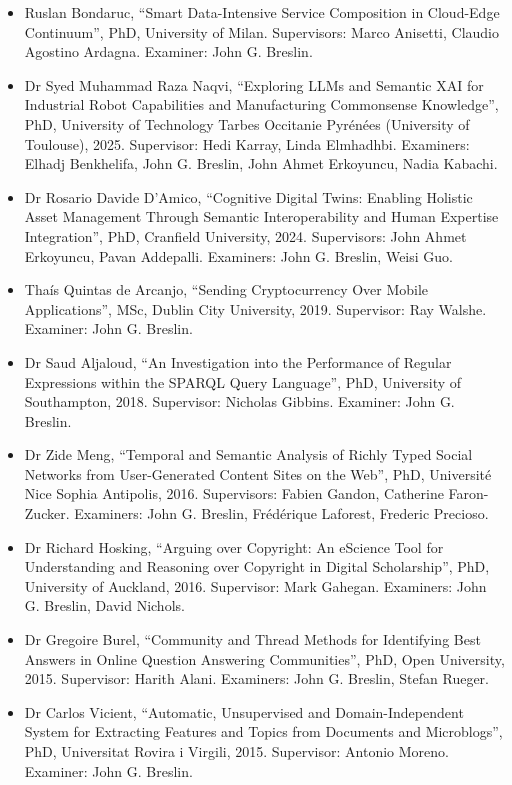\documentclass[10pt,a4paper]{res} %
\begin{document}
\begin{resume}
\begin{itemize} \itemsep -2pt
\item Ruslan Bondaruc, ``Smart Data-Intensive Service Composition in Cloud-Edge Continuum'', PhD, University of Milan. Supervisors: Marco Anisetti, Claudio Agostino Ardagna. Examiner: John G. Breslin.
\item Dr Syed Muhammad Raza Naqvi, ``Exploring LLMs and Semantic XAI for Industrial Robot Capabilities and Manufacturing Commonsense Knowledge'', PhD, University of Technology Tarbes Occitanie Pyr\'{e}n\'{e}es (University of Toulouse), 2025. Supervisor: Hedi Karray, Linda Elmhadhbi. Examiners: Elhadj Benkhelifa, John G. Breslin, John Ahmet Erkoyuncu, Nadia Kabachi. %
\item Dr Rosario Davide D'Amico, ``Cognitive Digital Twins: Enabling Holistic Asset Management Through Semantic Interoperability and Human Expertise Integration'', PhD, Cranfield University, 2024. Supervisors: John Ahmet Erkoyuncu, Pavan Addepalli. Examiners: John G. Breslin, Weisi Guo. %
\item Tha\'{i}s Quintas de Arcanjo, ``Sending Cryptocurrency Over Mobile Applications'', MSc, Dublin City University, 2019. Supervisor: Ray Walshe. Examiner: John G. Breslin.
\item Dr Saud Aljaloud, ``An Investigation into the Performance of Regular Expressions within the SPARQL Query Language'', PhD, University of Southampton, 2018. Supervisor: Nicholas Gibbins. Examiner: John G. Breslin. %
\item Dr Zide Meng, ``Temporal and Semantic Analysis of Richly Typed Social Networks from User-Generated Content Sites on the Web'', PhD, Universit\'{e} Nice Sophia Antipolis, 2016. Supervisors: Fabien Gandon, Catherine Faron-Zucker. Examiners: John G. Breslin, Fr\'{e}d\'{e}rique Laforest, Frederic Precioso. %
\item Dr Richard Hosking, ``Arguing over Copyright: An eScience Tool for Understanding and Reasoning over Copyright in Digital Scholarship'', PhD, University of Auckland, 2016. Supervisor: Mark Gahegan. Examiners: John G. Breslin, David Nichols.
\item Dr Gregoire Burel, ``Community and Thread Methods for Identifying Best Answers in Online Question Answering Communities'', PhD, Open University, 2015. Supervisor: Harith Alani. Examiners: John G. Breslin, Stefan Rueger. %
\item Dr Carlos Vicient, ``Automatic, Unsupervised and Domain-Independent System for Extracting Features and Topics from Documents and Microblogs'', PhD, Universitat Rovira i Virgili, 2015. Supervisor: Antonio Moreno. Examiner: John G. Breslin.

\end{itemize}
\end{resume}
\end{document}
